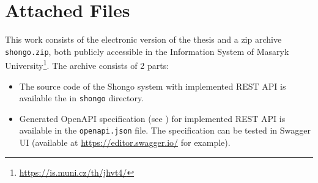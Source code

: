 \chapter{Attached Files} \label{apx:files}
This work consists of the electronic version of the thesis and a zip archive \texttt{shongo.zip}, both publicly accessible in the Information System of Masaryk University\footnote{\url{https://is.muni.cz/th/jhvt4/}}.
The archive consists of 2 parts:
\begin{itemize}
    \item The source code of the Shongo system with implemented REST API is available the in \texttt{shongo} directory.
    \item Generated OpenAPI specification (see ) for implemented REST API is available in the \texttt{openapi.json} file. The specification can be tested in Swagger UI (available at \url{https://editor.swagger.io/} for example).
\end{itemize}
